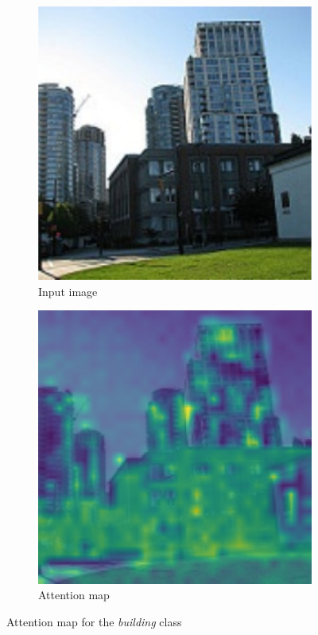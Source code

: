 \documentclass[twocolumn,superscriptaddress,aps]{revtex4-1}
\begin{document}
\begin{figure}[H]
    \centering
    \begin{subfigure}{0.235 \textwidth}
        \includegraphics[width=\textwidth]{images/img_attn_build.png}
        \caption{Input image}
    \end{subfigure}
    \begin{subfigure}{0.235 \textwidth}
        \includegraphics[width=\textwidth]{images/map_attn_build.png}
        \caption{Attention map}
    \end{subfigure}
    \caption{Attention map for the \textit{building} class}
    \label{fig:attent_map3}
\end{figure}
\end{document}
